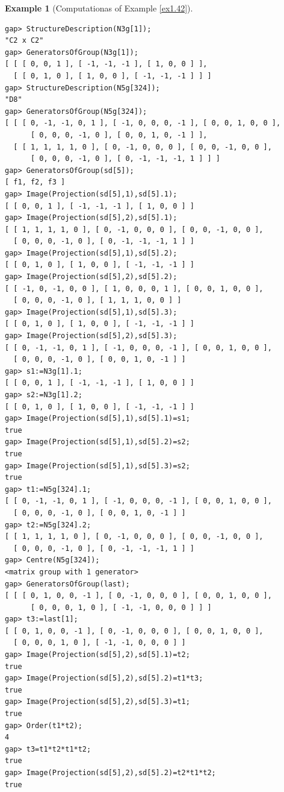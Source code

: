 \documentclass{amsart}
\theoremstyle{plain}
\theoremstyle{definition}
\newtheorem{example}[theorem]{Example}
\theoremstyle{remark}
\begin{document}
{\begin{example}[{Computationas of Example \ref{ex1.42}}]
\begin{verbatim}
gap> StructureDescription(N3g[1]);
"C2 x C2"
gap> GeneratorsOfGroup(N3g[1]);
[ [ [ 0, 0, 1 ], [ -1, -1, -1 ], [ 1, 0, 0 ] ], 
  [ [ 0, 1, 0 ], [ 1, 0, 0 ], [ -1, -1, -1 ] ] ]
gap> StructureDescription(N5g[324]);
"D8"
gap> GeneratorsOfGroup(N5g[324]);
[ [ [ 0, -1, -1, 0, 1 ], [ -1, 0, 0, 0, -1 ], [ 0, 0, 1, 0, 0 ], 
      [ 0, 0, 0, -1, 0 ], [ 0, 0, 1, 0, -1 ] ], 
  [ [ 1, 1, 1, 1, 0 ], [ 0, -1, 0, 0, 0 ], [ 0, 0, -1, 0, 0 ], 
      [ 0, 0, 0, -1, 0 ], [ 0, -1, -1, -1, 1 ] ] ]
gap> GeneratorsOfGroup(sd[5]);
[ f1, f2, f3 ]
gap> Image(Projection(sd[5],1),sd[5].1);
[ [ 0, 0, 1 ], [ -1, -1, -1 ], [ 1, 0, 0 ] ]
gap> Image(Projection(sd[5],2),sd[5].1);
[ [ 1, 1, 1, 1, 0 ], [ 0, -1, 0, 0, 0 ], [ 0, 0, -1, 0, 0 ], 
  [ 0, 0, 0, -1, 0 ], [ 0, -1, -1, -1, 1 ] ]
gap> Image(Projection(sd[5],1),sd[5].2);
[ [ 0, 1, 0 ], [ 1, 0, 0 ], [ -1, -1, -1 ] ]
gap> Image(Projection(sd[5],2),sd[5].2);
[ [ -1, 0, -1, 0, 0 ], [ 1, 0, 0, 0, 1 ], [ 0, 0, 1, 0, 0 ], 
  [ 0, 0, 0, -1, 0 ], [ 1, 1, 1, 0, 0 ] ]
gap> Image(Projection(sd[5],1),sd[5].3);
[ [ 0, 1, 0 ], [ 1, 0, 0 ], [ -1, -1, -1 ] ]
gap> Image(Projection(sd[5],2),sd[5].3);
[ [ 0, -1, -1, 0, 1 ], [ -1, 0, 0, 0, -1 ], [ 0, 0, 1, 0, 0 ], 
  [ 0, 0, 0, -1, 0 ], [ 0, 0, 1, 0, -1 ] ]
gap> s1:=N3g[1].1;
[ [ 0, 0, 1 ], [ -1, -1, -1 ], [ 1, 0, 0 ] ]
gap> s2:=N3g[1].2;
[ [ 0, 1, 0 ], [ 1, 0, 0 ], [ -1, -1, -1 ] ]
gap> Image(Projection(sd[5],1),sd[5].1)=s1;
true
gap> Image(Projection(sd[5],1),sd[5].2)=s2;
true
gap> Image(Projection(sd[5],1),sd[5].3)=s2;
true
gap> t1:=N5g[324].1;
[ [ 0, -1, -1, 0, 1 ], [ -1, 0, 0, 0, -1 ], [ 0, 0, 1, 0, 0 ], 
  [ 0, 0, 0, -1, 0 ], [ 0, 0, 1, 0, -1 ] ]
gap> t2:=N5g[324].2;
[ [ 1, 1, 1, 1, 0 ], [ 0, -1, 0, 0, 0 ], [ 0, 0, -1, 0, 0 ], 
  [ 0, 0, 0, -1, 0 ], [ 0, -1, -1, -1, 1 ] ]
gap> Centre(N5g[324]);
<matrix group with 1 generator>
gap> GeneratorsOfGroup(last);
[ [ [ 0, 1, 0, 0, -1 ], [ 0, -1, 0, 0, 0 ], [ 0, 0, 1, 0, 0 ], 
      [ 0, 0, 0, 1, 0 ], [ -1, -1, 0, 0, 0 ] ] ]
gap> t3:=last[1];
[ [ 0, 1, 0, 0, -1 ], [ 0, -1, 0, 0, 0 ], [ 0, 0, 1, 0, 0 ], 
  [ 0, 0, 0, 1, 0 ], [ -1, -1, 0, 0, 0 ] ]
gap> Image(Projection(sd[5],2),sd[5].1)=t2;
true
gap> Image(Projection(sd[5],2),sd[5].2)=t1*t3;
true
gap> Image(Projection(sd[5],2),sd[5].3)=t1;
true
gap> Order(t1*t2);
4
gap> t3=t1*t2*t1*t2;
true
gap> Image(Projection(sd[5],2),sd[5].2)=t2*t1*t2;
true
\end{verbatim}
\end{example}

}
\end{document}
